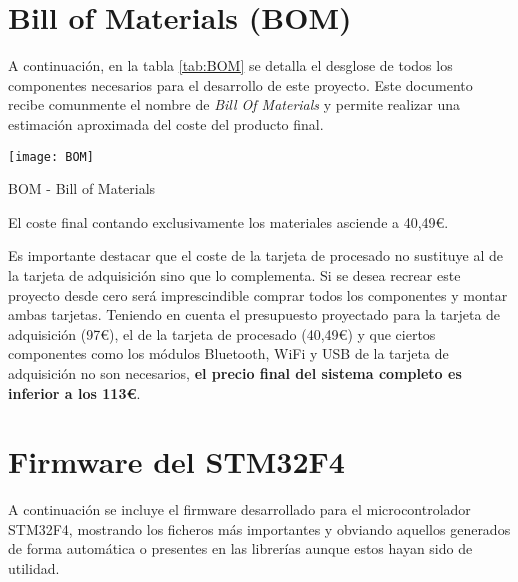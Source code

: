 \chapter{Bill of Materials (BOM)\label{sec:BOM}}

A continuación, en la tabla \ref{tab:BOM} se detalla el desglose de todos los componentes necesarios para el desarrollo de este proyecto. Este documento recibe comunmente el nombre de \textit{Bill Of Materials} y permite realizar una estimación aproximada del coste del producto final.

\begin{table} [H]
\centering
\texttt{[image: BOM]}
\caption{BOM - Bill of Materials}
\label{tab:BOM}
\end{table}

El coste final contando exclusivamente los materiales asciende a 40,49€. 

\clearpage

Es importante destacar que el coste de la tarjeta de procesado no sustituye al de la tarjeta de adquisición sino que lo complementa. Si se desea recrear este proyecto desde cero será imprescindible comprar todos los componentes y montar ambas tarjetas.
Teniendo en cuenta el presupuesto proyectado para la tarjeta de adquisición (97€), el de la tarjeta de procesado (40,49€) y que ciertos componentes como los módulos Bluetooth, WiFi y USB de la tarjeta de adquisición no son necesarios, \textbf{el precio final del sistema completo es inferior a los 113€}.

\chapter{Firmware del STM32F4\label{sec:Apendice_Code_STM}}

A continuación se incluye el firmware desarrollado para el microcontrolador STM32F4, mostrando los ficheros más importantes y obviando aquellos generados de forma automática o presentes en las librerías aunque estos hayan sido de utilidad.

